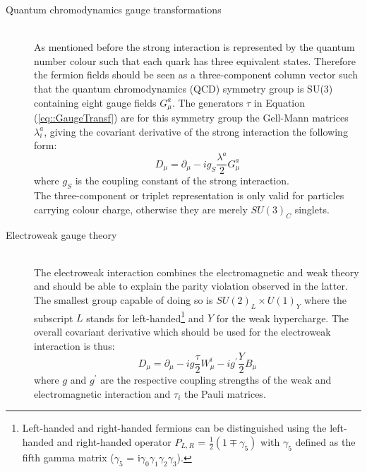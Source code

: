 \begin{myindentpar}
  \begin{description}
    \item[Quantum chromodynamics gauge transformations] \hfill \\
    As mentioned before the strong interaction is represented by the quantum number colour such that each quark has three equivalent states. Therefore the fermion fields should be seen as a three-component column vector such that the quantum chromodynamics (QCD) symmetry group is SU(3) containing eight gauge fields $G_{\mu}^{a}$. 
    The generators $\tau$ in Equation (\ref{eq::GaugeTransf}) are for this symmetry group the Gell-Mann matrices $\lambda_{i}^{a}$, giving the covariant derivative of the strong interaction the following form:
    \begin{equation}
      D_{\mu} = \partial_{\mu} - i g_{S} \frac{\lambda^{a}}{2} G_{\mu}^a
    \end{equation}
    where $g_{S}$ is the coupling constant of the strong interaction. \\
    The three-component or triplet representation is only valid for particles carrying colour charge, otherwise they are merely $SU(3)_{C}$ singlets. 
    
    \item[Electroweak gauge theory] \hfill \\
    The electroweak interaction combines the electromagnetic and weak theory and should be able to explain the parity violation observed in the latter. The smallest group capable of doing so is $SU(2)_{L} \times U(1)_{Y}$ where the subscript $L$ stands for left-handed\footnote{
      Left-handed and right-handed fermions can be distinguished using the left-handed and right-handed operator $P_{L,R}$ = $\frac{1}{2}(1 \mp \gamma_{5})$ with $\gamma_5$ defined as the fifth gamma matrix ($\gamma_5$ = i$\gamma_0 \gamma_1 \gamma_2 \gamma_3$). 
    }
    and $Y$ for the weak hypercharge.
    The overall covariant derivative which should be used for the electroweak interaction is thus:
    \begin{equation}
     D_{\mu} = \partial_{\mu} - i g \frac{\tau}{2} W_{\mu}^{i} - i g^{'} \frac{Y}{2} B_{\mu}
    \end{equation}
    where $g$ and $g^{'}$ are the respective coupling strengths of the weak and electromagnetic interaction and $\tau_{i}$ the Pauli matrices. 
    

\end{description}
\end{myindentpar}
